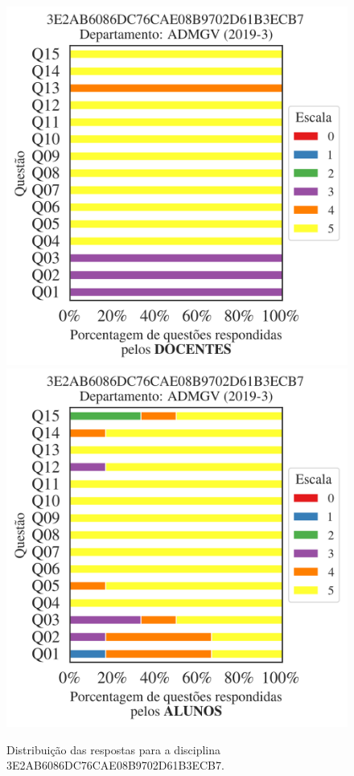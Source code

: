 \documentclass[a4paper,10pt]{article}
\begin{document}
\begin{figure}[h]
\centering
\includegraphics[width=0.485\linewidth]{analise_disciplina_departamento_ADMGV_3E2AB6086DC76CAE08B9702D61B3ECB7_docentes.png}
\includegraphics[width=0.485\linewidth]{analise_disciplina_departamento_ADMGV_3E2AB6086DC76CAE08B9702D61B3ECB7_alunos.png}
\caption{\label{fig:analise_geral_departamento}                Distribuição das respostas para a disciplina 3E2AB6086DC76CAE08B9702D61B3ECB7. }
\end{figure}
\end{document}
